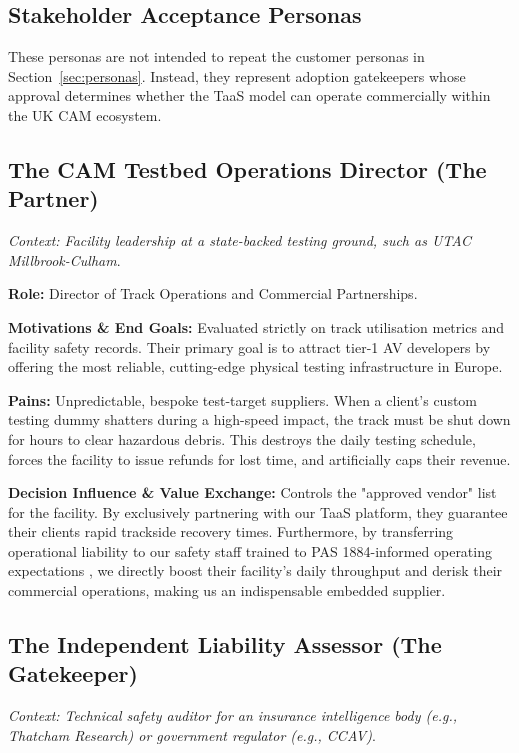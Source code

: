 \documentclass[11pt, a4paper]{report}
\numberwithin{equation}{section}
\begin{document}
\begin{refsection}
\section{Stakeholder Acceptance Personas}
\label{sec:paul_personas}

These personas are not intended to repeat the customer personas in Section~\ref{sec:personas}. Instead, they represent adoption gatekeepers whose approval determines whether the TaaS model can operate commercially within the UK CAM ecosystem.

\subsection{The CAM Testbed Operations Director (The Partner)}

\textit{Context: Facility leadership at a state-backed testing ground, such as UTAC Millbrook-Culham}.

\textbf{Role:} Director of Track Operations and Commercial Partnerships.

\textbf{Motivations \& End Goals:} Evaluated strictly on track utilisation metrics and facility safety records. Their primary goal is to attract tier-1 AV developers by offering the most reliable, cutting-edge physical testing infrastructure in Europe.

\textbf{Pains:} Unpredictable, bespoke test-target suppliers. When a client's custom testing dummy shatters during a high-speed impact, the track must be shut down for hours to clear hazardous debris. This destroys the daily testing schedule, forces the facility to issue refunds for lost time, and artificially caps their revenue.

\textbf{Decision Influence \& Value Exchange:} Controls the "approved vendor" list for the facility. By exclusively partnering with our TaaS platform, they guarantee their clients rapid trackside recovery times. Furthermore, by transferring operational liability to our safety staff trained to PAS 1884-informed operating expectations \cite{pas1884}, we directly boost their facility's daily throughput and derisk their commercial operations, making us an indispensable embedded supplier.

\subsection{The Independent Liability Assessor (The Gatekeeper)}

\textit{Context: Technical safety auditor for an insurance intelligence body (e.g., Thatcham Research) or government regulator (e.g., CCAV)}.


\end{refsection}
\end{document}
